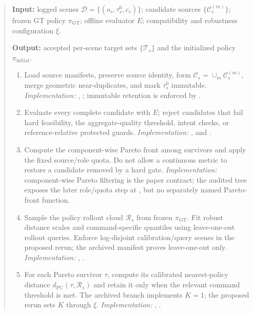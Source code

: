 \begin{quote}
\small
\textbf{Input:} logged scenes $\mathcal D=\{(o_s,\tau_s^0,c_s)\}$; candidate
sources $\{\mathcal C_s^{(m)}\}$; frozen GT policy $\pi_{\mathrm{GT}}$;
offline evaluator $E$; compatibility and robustness configuration $\xi$.

\textbf{Output:} accepted per-scene target sets $\{\mathcal T_s\}$ and the
initialized policy $\pi_{\mathrm{initial}}$.

\begin{enumerate}
  \item Load source manifests, preserve source identity, form
  $\mathcal C_s=\cup_m\mathcal C_s^{(m)}$, merge geometric near-duplicates,
  and mark
  $\tau_s^0$ immutable.  \emph{Implementation:}
  ,
  ; immutable retention is enforced by
  .

  \item Evaluate every complete candidate with $E$; reject candidates that
  fail hard feasibility, the aggregate-quality threshold, intent checks, or
  reference-relative protected guards.  \emph{Implementation:}
  ,
   and
  .

  \item Compute the component-wise Pareto front among survivors and apply the
  fixed source/role quota.  Do not allow a continuous metric to restore a
  candidate removed by a hard gate.  \emph{Implementation:} component-wise
  Pareto filtering is the paper contract; the audited tree exposes the later
  role/quota step at
  ,
  but no separately named Pareto-front function.

  \item Sample the policy rollout cloud $\mathcal R_s$ from frozen
  $\pi_{\mathrm{GT}}$.  Fit robust distance scales and command-specific
  quantiles using leave-one-out rollout queries.  Enforce log-disjoint
  calibration/query scenes in the proposed rerun; the archived manifest proves
  leave-one-out only.  \emph{Implementation:}
  ,
  .

  \item For each Pareto survivor $\tau$, compute its calibrated nearest-policy
  distance $d_{\mathrm{PC}}(\tau,\mathcal R_s)$ and retain it only when the
  relevant command threshold is met.  The archived branch implements $K=1$;
  the proposed rerun sets $K$ through $\xi$.  \emph{Implementation:}
  ,
  .


\end{enumerate}
\end{quote}
